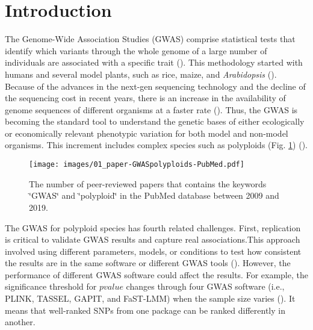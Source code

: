 \documentclass{article}
\begin{document}
\section{Introduction}
The Genome-Wide Association Studies (GWAS) comprise statistical tests that identify which variants through the whole genome of a large number of individuals are associated with a specific trait (\cite{cantor2010prioritizing,begum2012comprehensive}). This methodology started with humans and several model plants, such as rice, maize, and \emph{Arabidopsis} (\cite{lauc2010genomics,tian2011genome,cao2011whole,korte2013advantages,han2013sequencing}). Because of the advances in the next-gen sequencing technology and the decline of the sequencing cost in recent years, there is an increase in the availability of genome sequences of different organisms at a faster rate (\cite{ekblom2011applications,ellegren2014genome}). Thus, the GWAS is becoming the standard tool to understand the genetic bases of either ecologically or economically relevant phenotypic variation for both model and non-model organisms. This increment includes complex species such as polyploids (Fig. \ref{GWASpolyploids}) (\cite{ekblom2011applications,santure2018wild}).

\begin{figure}[H]
\begin{centering}
\texttt{[image: images/01\_paper-GWASpolyploids-PubMed.pdf]}
\par\end{centering}
\caption{The number of peer-reviewed papers that contains the keywords \char`\"{}GWAS\char`\"{} and \char`\"{}polyploid\char`\"{} in the PubMed database between 2009 and 2019.\label{GWASpolyploids}}
\end{figure}

The GWAS for polyploid species has fourth related challenges. First, replication is critical to validate GWAS results and capture real associations.This approach involved using different parameters, models, or conditions to test how consistent the results are in the same software or different GWAS tools (\cite{De2014,Pearson2008}). However, the performance of different GWAS software could affect the results. For example, the significance threshold for $pvalue$ changes through four GWAS software (i.e., PLINK, TASSEL, GAPIT, and FaST-LMM) when the sample size varies (\cite{Yan2019}). It means that well-ranked SNPs from one package can be ranked differently in another.
\end{document}
